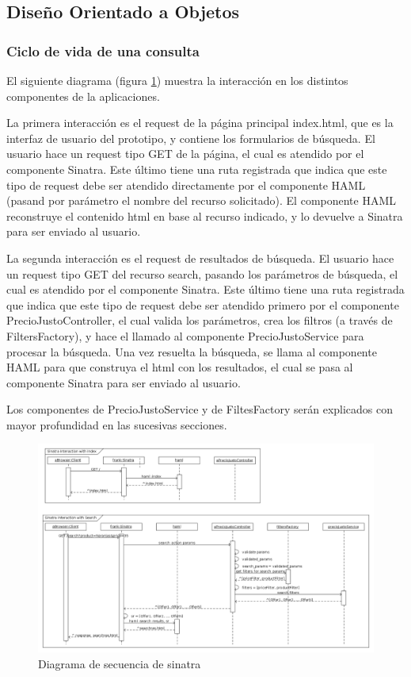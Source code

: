 \subsection{Diseño Orientado a Objetos}

\subsubsection{Ciclo de vida de una consulta}

El siguiente diagrama (figura \ref{fig:sequence_sinatra}) muestra la interacci\'on en los distintos componentes de la aplicaciones.

La primera interacci\'on es el request de la p\'agina principal index.html, que es la interfaz de usuario del prototipo, y contiene los formularios de b\'usqueda. El usuario hace un request tipo GET de la p\'agina, el cual es atendido por el componente Sinatra. Este \'ultimo tiene una ruta registrada que indica que este tipo de request debe ser atendido directamente por el componente HAML (pasand por par\'ametro el nombre del recurso solicitado). El componente HAML reconstruye el contenido html en base al recurso indicado, y lo devuelve a Sinatra para ser enviado al usuario.

La segunda interacci\'on es el request de resultados de b\'usqueda. El usuario hace un request tipo GET del recurso search, pasando los par\'ametros de b\'usqueda, el cual es atendido por el componente Sinatra. Este \'ultimo tiene una ruta registrada que indica que este tipo de request debe ser atendido primero por el componente PrecioJustoController, el cual valida los par\'ametros, crea los filtros (a trav\'es de FiltersFactory), y hace el llamado al componente PrecioJustoService para procesar la b\'usqueda. Una vez resuelta la b\'usqueda, se llama al componente HAML para que construya el html con los resultados, el cual se pasa al componente Sinatra para ser enviado al usuario.

Los componentes de PrecioJustoService y de FiltesFactory ser\'an explicados con mayor profundidad en las sucesivas secciones.

\begin{figure}[h]
\centerline{\includegraphics[width=0.6\paperwidth]{./imgs/sequence_diagram_sinatra.png}}
\caption{Diagrama de secuencia de sinatra}
\label{fig:sequence_sinatra}
\end{figure}

